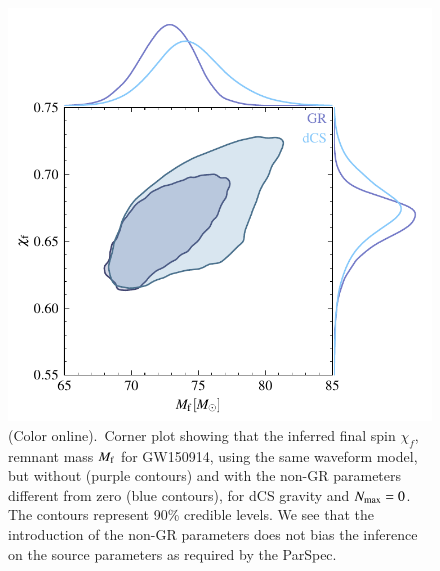 \documentclass[twocolumn,
               prd,
               aps,
               superscriptaddress,
               tightenlines,
               nofootinbib,
               eqsecnum,
               amsfonts,
               amsmath,
               longbibliography]{revtex4-1}
\begin{document}
\begin{figure}[t]
\includegraphics[width=0.9\columnwidth]{figs/tmp_GW150914_intrinsic_params_remnant.pdf}
\caption{(Color online).~Corner plot showing that the inferred final spin $\chi_f$,
remnant mass $M_{\rm f}$ for GW150914, using the same waveform model,
but without (purple contours) and with the non-GR parameters
different from zero (blue contours), for
dCS gravity and $N_{\rm max}=0$.
%
The contours represent 90\% credible levels.
%
We see that the introduction of the non-GR parameters does not bias the
inference on the source parameters as required by the ParSpec.
}
\label{fig:corner_plot}
\end{figure}
\end{document}
